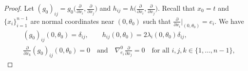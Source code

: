 \documentclass[JEP,XML,SOM,Unicode,NoFloatCountersInSection]{cedram}
\theoremstyle{definition}
\renewcommand{\>}{{\rangle}}
\newcommand{\<}{{\langle}}
\begin{document}
\begin{proof}
Let $(g_0)_{ij}=g_0\bigl(\frac{\partial}{\partial x_i},\frac{\partial}{\partial x_j}\bigr)$ and $h_{ij}=h\bigl(\frac{\partial}{\partial x_i},\frac{\partial}{\partial x_j}\bigr)$. Recall that $x_0=t$ and $\{x_i\}_{i=1}^{n-1}$ are normal coordinates near $(0,\theta_0)$ such that $\frac{\partial}{\partial x_i}|_{(0,\theta_0)}=e_i$. We have
\begin{equation}\label{eq: normal_coordinates_negative}
\begin{aligned}
&(g_0)_{ij}(0,\theta_0)=\delta_{ij}, \qquad h_{ij}(0,\theta_0) = 2\lambda_i(0,\theta_0)\delta_{ij},\\
&\frac{\partial}{\partial x_k}(g_0)_{ij}(0,\theta_0)=0 \quad \text{and} \quad \nabla^0_{e_i}\frac{\partial}{\partial x_j}=0 \quad\text{for all } i,j,k\in\{1,\ldots,n-1\},
\end{aligned}
\end{equation}


\end{proof}
\end{document}
